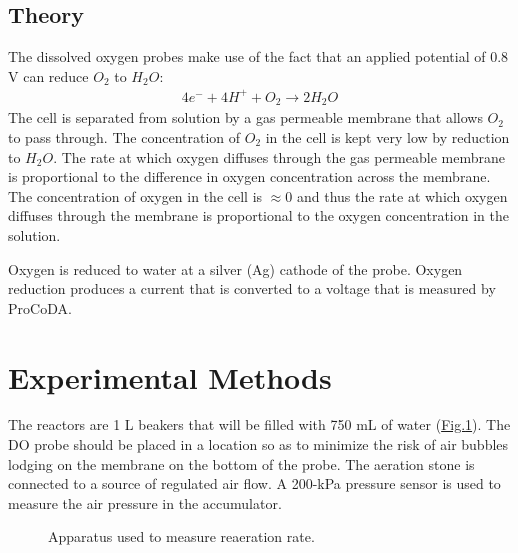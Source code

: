 \documentclass[letterpaper,10pt,english]{sphinxmanual}
\let\sphinxpxdimen\pdfpxdimen\else\newdimen\sphinxpxdimen
\begin{document}
\subsection{Theory}
\label{\detokenize{Gas_Transfer/Gas_Transfer:id1}}
The dissolved oxygen probes make use of the fact that an applied potential of 0.8 V can reduce \(O_2\) to \(H_2O\):
\begin{equation}\label{equation:Gas_Transfer/Gas_Transfer:Gas_Transfer/Gas_Transfer:7}
\begin{split}4 e^- + 4 H^+ + O_2 \mathrm{\to} 2 H_2O\end{split}
\end{equation}
The cell is separated from solution by a gas permeable membrane that allows \(O_2\) to pass through. The concentration of \(O_2\) in the cell is kept very low by reduction to \(H_2O\). The rate at which oxygen diffuses through the gas permeable membrane is proportional to the difference in oxygen concentration across the membrane. The concentration of oxygen in the cell is \(\mathrm{\approx}0\) and thus the rate at which oxygen diffuses through the membrane is proportional to the oxygen concentration in the solution.

Oxygen is reduced to water at a silver (Ag) cathode of the probe. Oxygen reduction produces a current that is converted to a voltage that is measured by ProCoDA.


\section{Experimental Methods}
\label{\detokenize{Gas_Transfer/Gas_Transfer:experimental-methods}}\label{\detokenize{Gas_Transfer/Gas_Transfer:heading-gas-transfer-experimental-methods}}
The reactors are 1 L beakers that will be filled with 750 mL of water (\hyperref[\detokenize{Gas_Transfer/Gas_Transfer:figure-gas-schematic}]{Fig.\@ \ref{\detokenize{Gas_Transfer/Gas_Transfer:figure-gas-schematic}}}). The DO probe should be placed in a location so as to minimize the risk of air bubbles lodging on the membrane on the bottom of the probe. The aeration stone is connected to a source of regulated air flow. A 200-kPa pressure sensor is used to measure the air pressure in the accumulator.

\begin{figure}[htbp]
\centering
\capstart

\noindent\sphinxincludegraphics[width=600\sphinxpxdimen]{{Schematic1}.png}
\caption{Apparatus used to measure reaeration rate.}\label{\detokenize{Gas_Transfer/Gas_Transfer:id5}}\label{\detokenize{Gas_Transfer/Gas_Transfer:figure-gas-schematic}}\end{figure}
\end{document}
